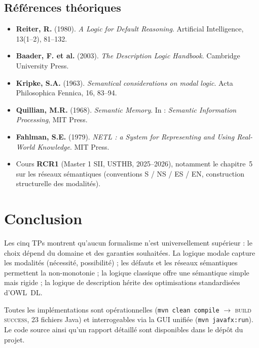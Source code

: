 \documentclass[11pt, a4paper]{article}
\newcommand{\code}[1]{\texttt{#1}}
\begin{document}
\subsection*{Références théoriques}

\begin{itemize}
  \item \textbf{Reiter, R.} (1980). \emph{A Logic for Default Reasoning}.
        Artificial Intelligence, 13(1--2), 81--132.

  \item \textbf{Baader, F. et al.} (2003). \emph{The Description Logic Handbook}.
        Cambridge University Press.

  \item \textbf{Kripke, S.A.} (1963). \emph{Semantical considerations on modal
        logic}. Acta Philosophica Fennica, 16, 83--94.

  \item \textbf{Quillian, M.R.} (1968). \emph{Semantic Memory}.
        In : \emph{Semantic Information Processing}, MIT Press.

  \item \textbf{Fahlman, S.E.} (1979). \emph{NETL : a System for Representing
        and Using Real-World Knowledge}. MIT Press.

  \item Cours \textbf{RCR1} (Master 1 SII, USTHB, 2025--2026), notamment le
        chapitre~5 sur les réseaux sémantiques (conventions S / NS / ES / EN,
        construction structurelle des modalités).
\end{itemize}

\newpage
\section{Conclusion}

Les cinq TPs montrent qu'aucun formalisme n'est universellement supérieur :
le choix dépend du domaine et des garanties souhaitées. La logique modale
capture les modalités (nécessité, possibilité) ; les défauts et les réseaux
sémantiques permettent la non-monotonie ; la logique classique offre une
sémantique simple mais rigide ; la logique de description hérite des
optimisations standardisées d'OWL~DL.

\medskip
\noindent Toutes les implémentations sont opérationnelles
(\code{mvn clean compile} $\to$ \textsc{build success}, 23 fichiers Java) et
interrogeables via la GUI unifiée (\code{mvn javafx:run}). Le code source
ainsi qu'un rapport détaillé sont disponibles dans le dépôt du projet.
\end{document}

